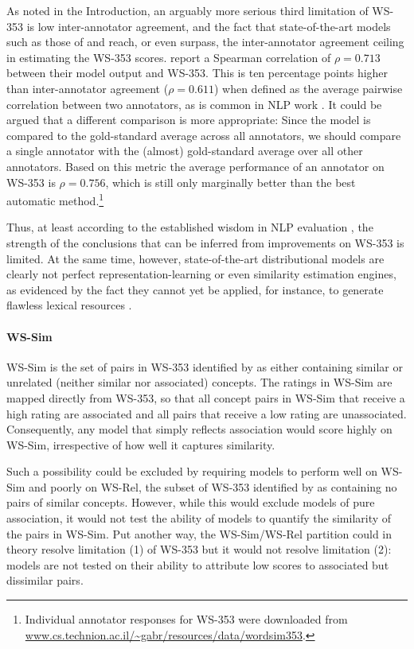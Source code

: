 As noted in the Introduction, an arguably more serious third limitation of WS-353 is low inter-annotator agreement, and the fact that state-of-the-art models such as those of \cite{collobert2008unified} and \cite{huang2012improving} reach, or even surpass, the inter-annotator agreement ceiling in estimating the WS-353 scores. \cite{huang2012improving} report a Spearman correlation of \(\rho = 0.713\) between their model output and WS-353. This is ten percentage points higher than inter-annotator agreement (\(\rho = 0.611\)) when defined as the average pairwise correlation between two annotators, as is common in NLP work \cite{pado2007flexible,reisinger2010mixture,silberer2014learning}. It could be argued that a different comparison is more appropriate: Since the model is compared to the gold-standard average across all annotators, we should compare a single annotator with the (almost) gold-standard average over all other annotators. Based on this metric the average performance of an annotator on WS-353 is  \( \rho=0.756 \), which is still only marginally better than the best automatic method.\footnote{Individual annotator responses for WS-353 were downloaded from \url{www.cs.technion.ac.il/~gabr/resources/data/wordsim353}.}  

Thus, at least according to the established wisdom in NLP evaluation \cite{yong1999case,cunningham2005information,resnik201011}, the strength of the conclusions that can be inferred from improvements on WS-353 is limited. At the same time, however, state-of-the-art distributional models are clearly not perfect representation-learning or even similarity estimation engines, as evidenced by the fact they cannot yet be applied, for instance, to generate flawless lexical resources \cite{alfonseca2002extending}. 

\paragraph{\bf WS-Sim} WS-Sim is the set of pairs in WS-353 identified by \cite{agirre2009study} as either containing similar or unrelated (neither similar nor associated) concepts. The ratings in WS-Sim are mapped directly from WS-353, so that all concept pairs in WS-Sim that receive a high rating are associated and all pairs that receive a low rating are unassociated. Consequently, any model that simply reflects association would score highly on WS-Sim, irrespective of how well it captures similarity. 

Such a possibility could be excluded by requiring models to perform well on WS-Sim and poorly on WS-Rel, the subset of WS-353 identified by \cite{agirre2009study} as containing no pairs of similar concepts. However, while this would exclude models of pure association, it would not test the ability of models to quantify the similarity of the pairs in WS-Sim. Put another way, the WS-Sim/WS-Rel partition could in theory resolve limitation (1) of WS-353 but it would not resolve limitation (2): models are not tested on their ability to attribute low scores to associated but dissimilar pairs. 

